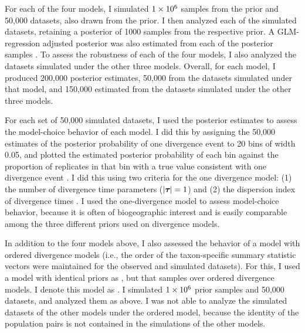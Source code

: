 For each of the four models, I simulated $1\times 10^{6}$ samples from the prior and
50,000 datasets, also drawn from the prior.
I then analyzed each of the simulated datasets, retaining a
posterior of 1000 samples from the respective prior.
A GLM-regression adjusted posterior was also estimated from each of the
posterior samples \citep{Leuenberger2010}.
To assess the robustness of each of the four models, I also analyzed the
datasets simulated under the other three models.
Overall, for each model, I produced 200,000 posterior estimates,
50,000 from the datasets simulated under that model,
and 150,000 estimated from the datasets simulated under the
other three models.

For each set of 50,000 simulated datasets, I used the posterior estimates
to assess the model-choice behavior of each model.
I did this by assigning the 50,000 estimates of the posterior probability
of one divergence event to 20 bins of width 0.05, and plotted
the estimated posterior probability of each bin against the proportion of
replicates in that bin with a true value consistent with one divergence
event \citep{Huelsenbeck2004,Oaks2012}.
I did this using two criteria for the one divergence model:
(1) the number of divergence time parameters ($\lvert \boldsymbol{\tau_{}} \rvert = 1$) and
(2) the dispersion index of divergence times \citep[$\divTimeDispersion <
0.01$][]{Hickerson2006,Huang2011}.
I used the one-divergence model to assess model-choice behavior, because
it is often of biogeographic interest and is easily comparable among
the three different priors used on divergence models.

In addition to the four models above, I also assessed the behavior of a model
with ordered divergence models (i.e., the order of the taxon-specific summary
statistic vectors were maintained for the observed and simulated datasets).
For this, I used a model with identical priors as \modelDPP, but that samples
over ordered divergence models.
I denote this model as \modelDPPOrdered.
I simulated $1\times 10^{6}$ prior samples and 50,000 datasets, and
analyzed them as above.
I was not able to analyze the simulated datasets of the other models under
the ordered model, because the identity of the population pairs is not
contained in the simulations of the other models.

